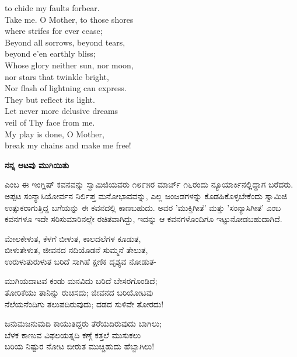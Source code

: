 \begin{myquote}
{to chide my faults forbear.\\
Take me. O Mother, to those shores\\
where strifes for ever cease;\\
Beyond all sorrows, beyond tears,\\
beyond e’en earthly bliss;\\
Whose glory neither sun, nor moon,\\
nor stars that twinkle bright,\\
Nor flash of lightning can express.\\
They but reflect its light.\\
Let never more delusive dreams\\
veil of Thy face from me.\\
My play is done, O Mother,\\
break my chains and make me free!}
\end{myquote}

\selectkan

\begin{center}
\textbf{ನನ್ನ ಆಟವು ಮುಗಿಯಿತು}
\end{center}

 ಎಂಬ ಈ ಇಂಗ್ಲಿಷ್ ಕವನವನ್ನು ಸ್ವಾಮಿಜಿಯವರು ೧೮೯೫ರ ಮಾರ್ಚ್ ೧೬ರಂದು ನ್ಯೂಯಾರ್ಕಿನಲ್ಲಿದ್ದಾಗ ಬರೆದರು. ಅಪ್ಪಟ ಸಂನ್ಯಾಸಿಯೋರ್ವನ ನಿರ್ಲಿಪ್ತ ಮನೋಭಾವವನ್ನು, ಎಲ್ಲ ಜಂಜಡಗಳನ್ನು ಕೊಡಹಿಕೊಳ್ಳಬೇಕೆಂದು ಸ್ವಾಮಿಜಿ ಉತ್ಸುಕರಾಗುತ್ತಿದ್ದ ಬಗೆಯನ್ನು ಈ ಕವನದಲ್ಲಿ ಕಾಣಬಹುದು. ಅವರ 'ಮುಕ್ತಿಗೀತೆ' ಮತ್ತು 'ಸಂನ್ಯಾಸಿಗೀತ' ಎಂಬ ಕವನಗಳೂ ಇದೇ ಸರಿಸುಮಾರಿನಲ್ಲೇ ರಚಿತವಾಗಿದ್ದು, ಇದನ್ನು ಆ ಕವನಗಳೊಂದಿಗೂ ಇಟ್ಟುನೋಡಬಹುದಾಗಿದೆ.

\begin{myquote}
ಮೇಲಕೇಳುತ, ಕೆಳಗೆ ಬೀಳುತ, ಕಾಲದಲೆಗಳ ಕೂಡುತ,\\ಬೀಳುತೇಳುತ, ಜೀವನದ ನದಿಯೊಡನೆ ಸುಮ್ಮನೆ ತೇಲುತ,\\ಉರುಳುತುರುಳುತ ಬರಿದೆ ಸಾಗಿಹೆ ಕ್ಷಣಿಕ ದೃಶ್ಯವ ನೋಡುತ-
\end{myquote}

\begin{myquote}
ಮುಗಿಯದಾಟವ ಕಂಡು ಮನವಿದು ಬರಿದೆ ಬೇಸರಗೊಂಡಿದೆ;\\ತೋರಿಕೆಯು ತಾನಿನ್ನು ರುಚಿಸದು; ಜೀವನದ ಬರಿಯೋಟವು\\ನೆಲೆಯನೆಂದಿಗು ತಲುಪದಿರುವುದು; ದಡದ ಸುಳಿವೇ ತೋರದು!
\end{myquote}

\begin{myquote}
ಜನುಮಜನುಮದಿ ಕಾಯುತಿದ್ದರು ತೆರೆಯದಿರುವುದು ಬಾಗಿಲು;\\ಬೆಳಕ ಕಾಣುವ ವಿಫಲಯತ್ನದಿ ಕಣ್ಗೆ ಕತ್ತಲೆ ಮುಸುಕಲು\\ಬರಿಯ ನಿಷ್ಟುರ ನೋಟ ಬೀರುತ ಮುಚ್ಚಿಹುದು ಹೆಬ್ಬಾಗಿಲು!
\end{myquote}

